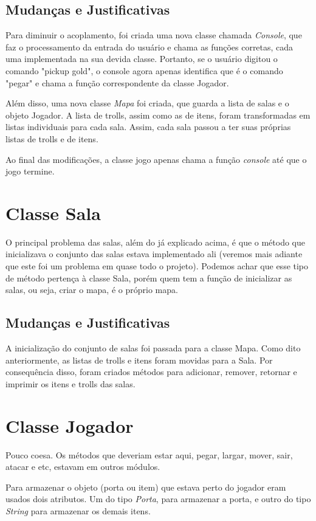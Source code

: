 \documentclass[runningheads,a4paper]{llncs}
\begin{document}
    \subsection{Mudanças e Justificativas}
        Para diminuir o acoplamento, foi criada uma nova classe chamada \emph{Console}, que faz o processamento da entrada do usuário e chama as funções corretas, cada uma implementada na sua devida classe. Portanto, se o usuário digitou o comando "pickup gold", o console agora apenas identifica que é o comando "pegar" e chama a função correspondente da classe Jogador.
        
        Além disso, uma nova classe \emph{Mapa} foi criada, que guarda a lista de salas e o objeto Jogador. A lista de trolls, assim como as de itens, foram transformadas em listas individuais para cada sala. Assim, cada sala passou a ter suas próprias listas de trolls e de itens.
        
        Ao final das modificações, a classe jogo apenas chama a função \emph{console} até que o jogo termine.

\section{Classe Sala}
    O principal problema das salas, além do já explicado acima, é que o método que inicializava o conjunto das salas estava implementado ali (veremos mais adiante que este foi um problema em quase todo o projeto). Podemos achar que esse tipo de método pertença à classe Sala, porém quem tem a função de inicializar as salas, ou seja, criar o mapa, é o próprio mapa.

    \subsection{Mudanças e Justificativas}
        A inicialização do conjunto de salas foi passada para a classe Mapa. Como dito anteriormente, as listas de trolls e itens foram movidas para a Sala. Por consequência disso, foram criados métodos para adicionar, remover, retornar e imprimir os itens e trolls das salas.

\section{Classe Jogador}
    Pouco coesa. Os métodos que deveriam estar aqui, pegar, largar, mover, sair, atacar e etc, estavam em outros módulos.
    
    Para armazenar o objeto (porta ou item) que estava perto do jogador eram usados dois atributos. Um do tipo \emph{Porta}, para armazenar a porta, e outro do tipo \emph{String} para armazenar os demais itens.
\end{document}
